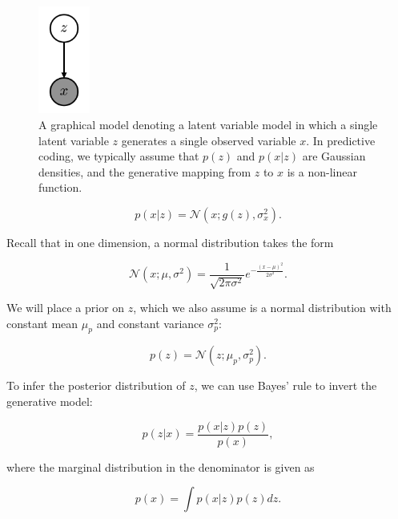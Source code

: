 \begin{figure}
    \centering
    \includegraphics[width=0.15\textwidth]{images/predictive_coding/simple_latent_graphical_model.png}
    \caption{A graphical model denoting a latent variable model in which a single latent variable $z$ generates a single observed variable $x$. In predictive coding, we typically assume that $p(z)$ and $p(x|z)$ are Gaussian densities, and the generative mapping from $z$ to $x$ is a non-linear function.}
    \label{fig: simple_latent_model}
\end{figure}

\begin{equation}
	p (x | z) = \mathcal{N} (x; g(z), \sigma^2_x).
\end{equation}

\noindent Recall that in one dimension, a normal distribution takes the form

\begin{equation}
	\mathcal{N} (x; \mu, \sigma^2) = \frac{1}{\sqrt{2 \pi \sigma^2}} e^{-\frac{(x - \mu)^2}{2 \sigma^2}}.
	\label{eq: 1d gaussian}
\end{equation}

\noindent We will place a prior on $z$, which we also assume is a normal distribution with constant mean $\mu_p$ and constant variance $\sigma^2_p$:

\begin{equation}
	p (z) = \mathcal{N} (z; \mu_p, \sigma^2_p).
\end{equation}

\noindent To infer the posterior distribution of $z$, we can use Bayes' rule to invert the generative model:

\begin{equation}
	p (z | x) = \frac{p(x | z) p(z)}{p(x)},
\end{equation}

\noindent where the marginal distribution in the denominator is given as

\begin{equation}
	p (x) = \int p(x | z) p(z) dz.
	\label{eq: intractable integration}
\end{equation}

